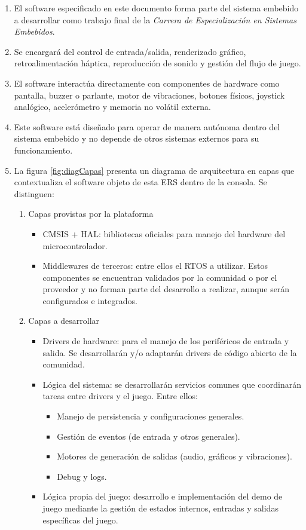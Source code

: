 \documentclass[11pt,a4paper]{article}
\begin{document}
\begin{enumerate}
  \item El software especificado en este documento forma parte del sistema embebido \textit{\ttitle} a desarrollar como trabajo final de la \textit{Carrera de Especialización en Sistemas Embebidos}. 
  \item Se encargará del control de entrada/salida, renderizado gráfico, retroalimentación háptica, reproducción de sonido y gestión del flujo de juego.
  \item El software interactúa directamente con componentes de hardware como pantalla, buzzer o parlante, motor de vibraciones, botones físicos, joystick analógico, acelerómetro y memoria no volátil externa.
  \item Este software está diseñado para operar de manera autónoma dentro del sistema embebido y no depende de otros sistemas externos para su funcionamiento. 
  \item La figura \ref{fig:diagCapas} presenta un diagrama de arquitectura en capas que contextualiza el software objeto de esta ERS dentro de la consola. Se distinguen:
  \begin{enumerate}
    \item Capas provistas por la plataforma
    \begin{itemize}
      \item CMSIS + HAL: bibliotecas oficiales para manejo del hardware del microcontrolador.
      \item Middlewares de terceros: entre ellos el RTOS a utilizar. Estos componentes se encuentran validados por la comunidad o por el proveedor y no forman parte del desarrollo a realizar, aunque serán configurados e integrados.
    \end{itemize}
    \item Capas a desarrollar
    \begin{itemize}
      \item Drivers de hardware: para el manejo de los periféricos de entrada y salida. Se desarrollarán y/o adaptarán drivers de código abierto de la comunidad.
      \item Lógica del sistema: se desarrollarán servicios comunes que coordinarán tareas entre drivers y el juego. Entre ellos:
      \begin{itemize}
        \item Manejo de persistencia y configuraciones generales.
        \item Gestión de eventos (de entrada y otros generales).
        \item Motores de generación de salidas (audio, gráficos y vibraciones).
        \item Debug y logs.
      \end{itemize}
      \item Lógica propia del juego: desarrollo e implementación del demo de juego mediante la gestión de estados internos, entradas y salidas específicas del juego.
    \end{itemize}
  \end{enumerate}
\end{enumerate}
\end{document}
